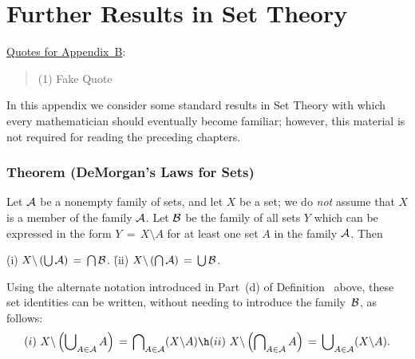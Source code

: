 
%
%



                        \chapter{Further Results in Set Theory}
                        \label{SectAAdd2}

\VV

        \underline{Quotes for Appendix~B}:

\V

\begin{quotation}
{\footnotesize

        (1) Fake Quote

}%
\end{quotation}


        In this appendix we consider some standard results in Set Theory with which every mathematician should eventually become familiar;
    however, this material is not required for reading the preceding chapters.

\VV

                 \subsection{\small{\bf Theorem (DeMorgan's Laws for Sets)}}

        Let ${\cal A}$ be a nonempty family of sets, and let $X$ be a set; we do {\em not} assume that $X$ is a member of the family ${\cal A}$.
    Let ${\cal B}$ be the family of all sets $Y$ which can be expressed in the form $Y \,=\, X{\setminus}A$ for at least one set $A$ in the family ${\cal A}$. Then

\V

        (i) $X{\setminus}\left({\bigcup}\, {\cal A}\right) \,=\, {\bigcap}\, {\cal B}$.
    \h
        (ii) $X{\setminus}\left({\bigcap}\, {\cal A}\right) \,=\, {\bigcup}\, {\cal B}$.

\noindent Using the alternate notation introduced in Part~(d) of Definition~ above,
    these set identities can be written, without needing to introduce the family~${\cal B}$, as follows:
        \begin{displaymath}
        (i)\,\, X{\setminus}\left({\bigcup}_{A{\in}{\cal A}}\, A\right) \,=\, {\bigcap}_{A{\in}{\cal A}} (X{\setminus}A) \h
        (ii)\,\, X{\setminus}\left({\bigcap}_{A{\in}{\cal A}}\, A\right) \,=\, {\bigcup}_{A{\in}{\cal A}} (X{\setminus}A).
        \end{displaymath}
\V
\V

